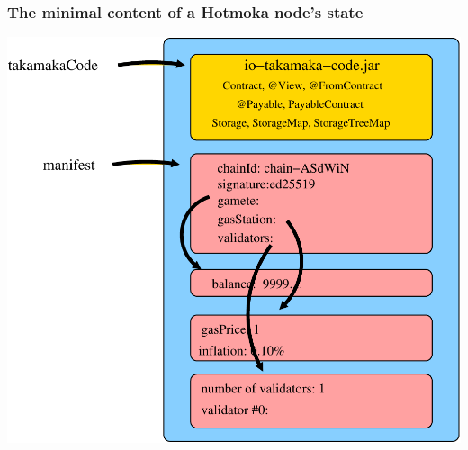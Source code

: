 \documentclass[11pt]{beamer}  %
\begin{document}
\begin{frame}\frametitle{The minimal content of a Hotmoka node's state}

  \begin{center}
    \includegraphics[scale=0.5,clip=false]{pictures/state1.pdf}
  \end{center}
  
\end{frame}
\end{document}
